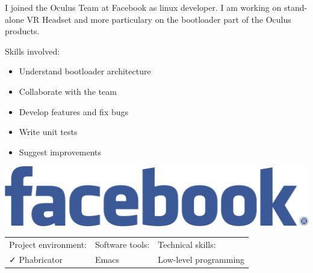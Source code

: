 \documentclass[letterpaper]{jm-cv} %
\begin{document}
\medskip
{}

\medskip
{}
\medskip

\small{


  I joined the Oculus Team at Facebook as linux developer.
  I am working on stand-alone VR Headset and more particulary on the bootloader part of the Oculus products.

  \vspace{0.2cm}
  \begin{minipage}{.7\textwidth}
    {\footnotesize\color{maingray}\bullet} Skills involved:
    \begin{itemize}
    \item[\color{mainblue}\faArrowRight] Understand bootloader architecture
    \item[\color{mainblue}\faArrowRight] Collaborate with the team
    \item[\color{mainblue}\faArrowRight] Develop features and fix bugs
    \item[\color{mainblue}\faArrowRight] Write unit tests
    \item[\color{mainblue}\faArrowRight] Suggest improvements
    \end{itemize}
  \end{minipage}%
  \begin{minipage}{.3\textwidth}
    \center
    \includegraphics[scale=0.06]{logo-facebook.png}
  \end{minipage}
  \vspace{0.2cm}

  \begin{tabular}{ l l l }
    Project environment: & \hspace{1cm}Software tools: & \hspace{1cm}Technical skills:\\
    {\color{mainblue}\faCheck} Phabricator &
    \hspace{1cm}{\color{maingreen}\faCheck} Emacs &
    \hspace{1cm}{\color{maingray}\faCheck} Low-level programming\\


\end{tabular}}
\end{document}
